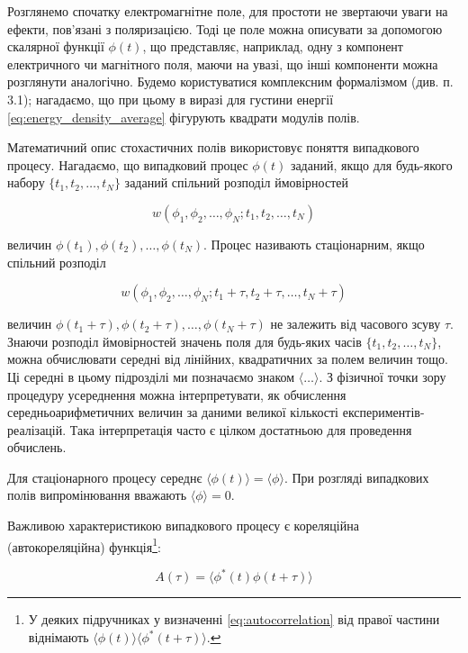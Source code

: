 Розглянемо спочатку електромагнітне поле, для простоти не звертаючи уваги на ефекти, пов’язані з поляризацією. Тоді це поле можна описувати за допомогою
скалярної функції \(\phi(t)\), що представляє, наприклад, одну з компонент електричного чи магнітного поля, маючи на увазі, що інші компоненти можна
розглянути аналогічно. Будемо користуватися комплексним формалізмом (див. п. 3.1); нагадаємо, що при цьому в виразі для густини енергії
\eqref{eq:energy_density_average} фігурують квадрати модулів полів.

Математичний опис стохастичних полів використовує поняття випадкового процесу. Нагадаємо, що випадковий процес \(\phi(t)\) заданий, якщо для будь-якого
набору \(\{t_1, t_2, \dots, t_N\}\) заданий спільний розподіл ймовірностей

\begin{equation*}
w(\phi_1, \phi_2, \dots, \phi_N; t_1, t_2, \dots, t_N)
\end{equation*}

величин \(\phi(t_1), \phi(t_2), \dots, \phi(t_N)\). Процес називають стаціонарним, якщо спільний розподіл

\begin{equation*}
w(\phi_1, \phi_2, \dots, \phi_N; t_1 + \tau, t_2 + \tau, \dots, t_N + \tau)
\end{equation*}

величин \(\phi(t_1 + \tau), \phi(t_2 + \tau), \dots, \phi(t_N + \tau)\) не залежить від часового зсуву \(\tau\). Знаючи розподіл ймовірностей значень
поля для будь-яких часів \(\{t_1, t_2, \dots, t_N\}\), можна обчислювати середні від лінійних, квадратичних за полем величин тощо. Ці середні в цьому
підрозділі ми позначаємо знаком \(\langle \dots \rangle\). З фізичної точки зору процедуру усереднення можна інтерпретувати, як обчислення
середньоарифметичних величин за даними великої кількості експериментів-реалізацій. Така інтерпретація часто є цілком достатньою для проведення обчислень.

Для стаціонарного процесу середнє \(\langle \phi(t) \rangle = \langle \phi \rangle\). При розгляді випадкових полів випромінювання вважають \(\langle
\phi \rangle = 0\).

Важливою характеристикою випадкового процесу є кореляційна (автокореляційна) функція\footnote{У деяких підручниках у визначенні
\eqref{eq:autocorrelation} від правої частини віднімають \(\langle \phi(t) \rangle \langle \phi^{*}(t + \tau) \rangle\).}:

\begin{equation}
A(\tau) = \langle \phi^{*}(t) \phi(t + \tau) \rangle
\label{eq:autocorrelation}
\end{equation}

